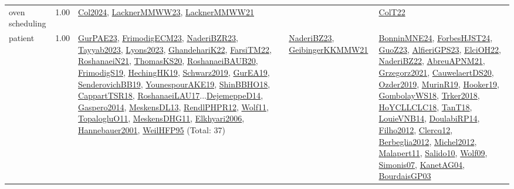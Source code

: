 {\begin{longtable}{p{3cm}r>{\raggedright\arraybackslash}p{6cm}>{\raggedright\arraybackslash}p{6cm}>{\raggedright\arraybackslash}p{8cm}}
\index{oven scheduling}\index{ApplicationAreas!oven scheduling}oven scheduling &  1.00 & \hyperref[detail:Col2024]{Col2024}, \hyperref[detail:LacknerMMWW23]{LacknerMMWW23}, \hyperref[detail:LacknerMMWW21]{LacknerMMWW21} &  & \hyperref[detail:ColT22]{ColT22}\\
\index{patient}\index{ApplicationAreas!patient}patient &  1.00 & \hyperref[detail:GurPAE23]{GurPAE23}, \hyperref[detail:FrimodigECM23]{FrimodigECM23}, \hyperref[detail:NaderiBZR23]{NaderiBZR23}, \hyperref[detail:Tayyab2023]{Tayyab2023}, \hyperref[detail:Lyons2023]{Lyons2023}, \hyperref[detail:GhandehariK22]{GhandehariK22}, \hyperref[detail:FarsiTM22]{FarsiTM22}, \hyperref[detail:RoshanaeiN21]{RoshanaeiN21}, \hyperref[detail:ThomasKS20]{ThomasKS20}, \hyperref[detail:RoshanaeiBAUB20]{RoshanaeiBAUB20}, \hyperref[detail:FrimodigS19]{FrimodigS19}, \hyperref[detail:HechingHK19]{HechingHK19}, \hyperref[detail:Schwarz2019]{Schwarz2019}, \hyperref[detail:GurEA19]{GurEA19}, \hyperref[detail:SenderovichBB19]{SenderovichBB19}, \hyperref[detail:YounespourAKE19]{YounespourAKE19}, \hyperref[detail:ShinBBHO18]{ShinBBHO18}, \hyperref[detail:CappartTSR18]{CappartTSR18}, \hyperref[detail:RoshanaeiLAU17]{RoshanaeiLAU17}...\hyperref[detail:DejemeppeD14]{DejemeppeD14}, \hyperref[detail:Gaspero2014]{Gaspero2014}, \hyperref[detail:MeskensDL13]{MeskensDL13}, \hyperref[detail:RendlPHPR12]{RendlPHPR12}, \hyperref[detail:Wolf11]{Wolf11}, \hyperref[detail:TopalogluO11]{TopalogluO11}, \hyperref[detail:MeskensDHG11]{MeskensDHG11}, \hyperref[detail:Elkhyari2006]{Elkhyari2006}, \hyperref[detail:Hannebauer2001]{Hannebauer2001}, \hyperref[detail:WeilHFP95]{WeilHFP95} (Total: 37) & \hyperref[detail:NaderiBZ23]{NaderiBZ23}, \hyperref[detail:GeibingerKKMMW21]{GeibingerKKMMW21} & \hyperref[detail:BonninMNE24]{BonninMNE24}, \hyperref[detail:ForbesHJST24]{ForbesHJST24}, \hyperref[detail:GuoZ23]{GuoZ23}, \hyperref[detail:AlfieriGPS23]{AlfieriGPS23}, \hyperref[detail:ElciOH22]{ElciOH22}, \hyperref[detail:NaderiBZ22]{NaderiBZ22}, \hyperref[detail:AbreuAPNM21]{AbreuAPNM21}, \hyperref[detail:Grzegorz2021]{Grzegorz2021}, \hyperref[detail:CauwelaertDS20]{CauwelaertDS20}, \hyperref[detail:Ozder2019]{Ozder2019}, \hyperref[detail:MurinR19]{MurinR19}, \hyperref[detail:Hooker19]{Hooker19}, \hyperref[detail:GombolayWS18]{GombolayWS18}, \hyperref[detail:Trker2018]{Trker2018}, \hyperref[detail:HoYCLLCLC18]{HoYCLLCLC18}, \hyperref[detail:TanT18]{TanT18}, \hyperref[detail:LouieVNB14]{LouieVNB14}, \hyperref[detail:DoulabiRP14]{DoulabiRP14}, \hyperref[detail:Filho2012]{Filho2012}, \hyperref[detail:Clercq12]{Clercq12}, \hyperref[detail:Berbeglia2012]{Berbeglia2012}, \hyperref[detail:Michel2012]{Michel2012}, \hyperref[detail:Malapert11]{Malapert11}, \hyperref[detail:Salido10]{Salido10}, \hyperref[detail:Wolf09]{Wolf09}, \hyperref[detail:Simonis07]{Simonis07}, \hyperref[detail:KanetAG04]{KanetAG04}, \hyperref[detail:BourdaisGP03]{BourdaisGP03}\\

\end{longtable}}
